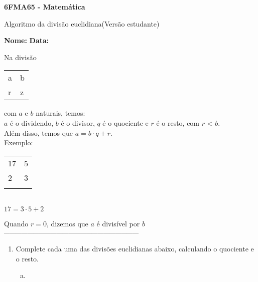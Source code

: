 \documentclass[a4paper,14pt]{article}
\begin{document}
	
	\noindent\textbf{6FMA65 - Matemática} 
	
	\begin{center}Algoritmo da divisão euclidiana(Versão estudante)
	\end{center}
	
	\noindent\textbf{Nome:} \underline{\hspace{10cm}}
	\noindent\textbf{Data:} \underline{\hspace{4cm}}
	
	\begin{multicols}{2}
		\noindent Na divisão
		\begin{table}[H]
			\centering
			\begin{tabular}{ll}
				\multicolumn{1}{l|}{a} & b \\ \cline{2-2} 
				r                      & z
			\end{tabular}
		\end{table}
		com $a$ e $b$ naturais, temos: \\
		$a$ é o dividendo, $b$ é o divisor, $q$ é o quociente e $r$ é o resto, com $r$ < $b$. \\
		Além disso, temos que $a = b \cdot q + r$. \\
		Exemplo: \begin{table}[H]
			\centering
			\begin{tabular}{ll}
				\multicolumn{1}{l|}{17} & 5 \\ \cline{2-2} 
				2                      & 3 \\\\
			\end{tabular} \\
			\centering $17 = 3 \cdot 5 + 2$
		\end{table} 
		Quando $r = 0$, dizemos que $a$ é divisível por $b$
    	\textsubscript{---------------------------------------------------------------------}
    	\begin{enumerate}
   			\item Complete cada uma das divisões euclidianas abaixo, calculando o quociente e o resto. \\
   			\begin{enumerate}[a)]
   				\item ~ \\
    			\begin{tabular}{ll}

\end{tabular}
\end{enumerate}
\end{enumerate}
\end{multicols}
\end{document}
